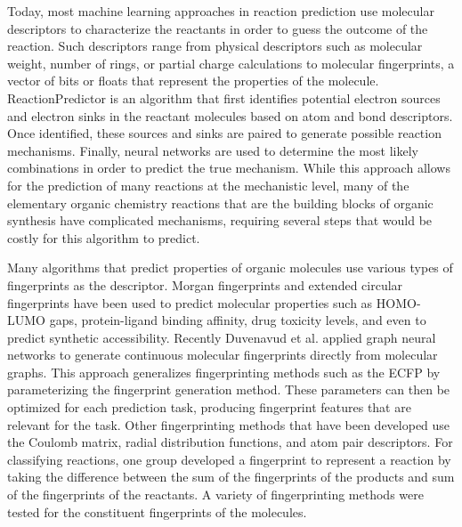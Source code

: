 Today, most machine learning approaches in reaction prediction use molecular descriptors to characterize the reactants in order to guess the outcome of the reaction. Such descriptors range from physical descriptors such as molecular weight, number of rings, or partial charge calculations to molecular fingerprints, a vector of bits or floats that represent the properties of the molecule. ReactionPredictor\cite{Kayala_2012, Kayala2011Learning} is an algorithm that first identifies potential electron sources and electron sinks in the reactant molecules based on atom and bond descriptors. Once identified, these sources and sinks are paired to generate possible reaction mechanisms. Finally, neural networks are used to determine the most likely combinations in order to predict the true mechanism. While this approach allows for the prediction of many reactions at the mechanistic level, many of the elementary organic chemistry reactions that are the building blocks of organic synthesis have complicated mechanisms, requiring several steps that would be costly for this algorithm to predict.

Many algorithms that predict properties of organic molecules use various types of fingerprints as the descriptor. Morgan fingerprints and extended circular fingerprints \cite{Morgan_1965,Rogers2010Extended} have been used to predict molecular properties such as HOMO-LUMO gaps\cite{Pyzer_Knapp_2015a}, protein-ligand binding affinity\cite{Ballester_2010}, drug toxicity levels\cite{Zhang_2006}, and even to predict synthetic accessibility\cite{Podolyan_2010}. Recently Duvenavud et al. applied graph neural networks\cite{duvenaud_convolutional_2015} to generate continuous molecular fingerprints directly from molecular graphs. This approach generalizes fingerprinting methods such as the ECFP by parameterizing the fingerprint generation method. These parameters can then be optimized for each prediction task, producing fingerprint features that are relevant for the task. Other fingerprinting methods that have been developed use the Coulomb matrix\cite{montavon2012learning}, radial distribution functions\cite{von2015fourier}, and atom pair descriptors\cite{Carhart_1985}. For classifying reactions, one group developed a fingerprint to represent a reaction by taking the difference between the sum of the fingerprints of the products and sum of the fingerprints of the reactants\cite{Schneider_2015}. A variety of fingerprinting methods were tested for the constituent fingerprints of the molecules.

